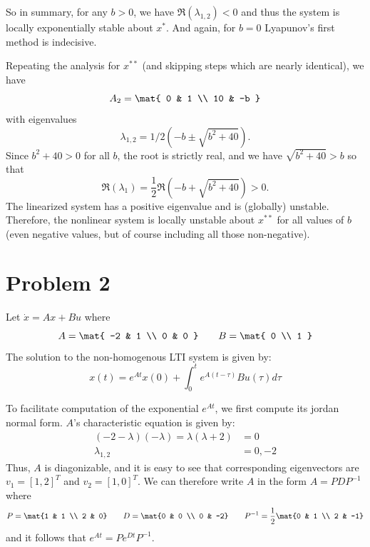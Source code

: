 \documentclass{homework}
\begin{document}
\begin{letterenum}
So in summary, for any $b > 0$, we have $\Re(\lambda_{1,2}) < 0$ and thus the system is
locally exponentially stable about $x^*$. And again, for $b=0$ Lyapunov's first method
is indecisive.

Repeating the analysis for $x^{**}$ (and skipping steps which are nearly identical),
we have
\begin{equation*}
    A_2 = \mat{
        0 & 1 \\
        10 & -b
    }
\end{equation*}
with eigenvalues
\begin{equation*}
    \lambda_{1,2} = 1/2 (-b \pm \sqrt{b^2 + 40}).
\end{equation*}
Since $b^2 + 40 > 0$ for all $b$, the root is strictly real, and we have
$\sqrt{b^2 + 40} > b$ so that
\begin{equation*}
    \Re(\lambda_1) = \frac{1}{2} \Re(-b + \sqrt{b^2 + 40}) > 0.
\end{equation*}
The linearized system has a positive eigenvalue and is (globally)
unstable. Therefore, the nonlinear system is locally unstable about
$x^{**}$ for all values of $b$ (even negative values, but of course including
all those non-negative).
\end{letterenum}

\section{Problem 2}
Let $\dot{x} = Ax + Bu$ where
\begin{equation*}
    A = \mat{
        -2 & 1 \\
        0 & 0
    } \qquad B = \mat{
        0 \\ 1
    }
\end{equation*}
The solution to the non-homogenous LTI system is given by:
\begin{equation}
    x(t) = e^{At} x(0) + \int_{0}^{t} e^{A (t - \tau)} B u(\tau) d\tau
    \label{eq:non-homogenous-solution}
\end{equation}

To facilitate computation of the exponential $e^{At}$, we first compute
its jordan normal form. $A$'s characteristic equation is given by:
\begin{align*}
    (-2 - \lambda) (-\lambda) = \lambda( \lambda + 2) &= 0 \\
    \lambda_{1,2} &= 0, -2
\end{align*}
Thus, $A$ is diagonizable, and it is easy to see that corresponding eigenvectors
are $v_1 = [1, 2]^T$ and $v_2 = [1, 0]^T$. We can therefore write
$A$ in the form $A = PDP^{-1}$ where
\begin{equation*}
    P = \mat{1 & 1 \\ 2 & 0} \qquad D = \mat{0 & 0 \\ 0 & -2}
        \qquad P^{-1} = \frac{1}{2} \mat{0 & 1 \\ 2 & -1}
\end{equation*}
and it follows that $e^{At} = Pe^{Dt}P^{-1}$.
\end{document}
